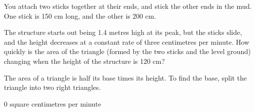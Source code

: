 \begin{Mquestion}
You attach two sticks together at their ends, and stick the other ends in the mud. One stick is 150 cm long, and the other is 200 cm.
\begin{center}\end{center}
The structure starts out being 1.4 metres high at its peak, but the sticks slide, and the height decreases at a constant rate of three centimetres per minute. How quickly is the area of the triangle (formed by the two sticks and the level ground) changing when the height of the structure is 120 cm?
\end{Mquestion}
\begin{hint}
The area of a triangle is half its base times its height. To find the base, split the triangle into two right triangles.
\end{hint}
\begin{answer}
0 square centimetres per minute
\end{answer}
